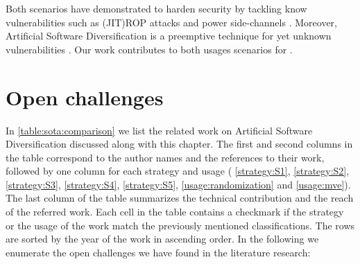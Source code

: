 %

Both scenarios have demonstrated to harden security by tackling know vulnerabilities such as (JIT)ROP attacks \cite{jackson2011compiler} and power side-channels \cite{amarilli2011can}. Moreover, Artificial Software Diversification is a preemptive technique for yet unknown vulnerabilities \cite{jackson}. Our work contributes to both usages scenarios for \wasm.



\section{Open challenges}
\label{sota:openchallenges}

In \autoref{table:sota:comparison} we list the related work on Artificial Software Diversification discussed along with this chapter. The first and second columns in the table correspond to the author names and the references to their work, followed by one column for each strategy and usage ( \autoref{strategy:S1},  \autoref{strategy:S2},  \autoref{strategy:S3},  \autoref{strategy:S4},  \autoref{strategy:S5}, \autoref{usage:randomization} and \autoref{usage:mve}). The last column of the table summarizes the technical contribution and the reach of the referred work. Each cell in the table contains a checkmark if the strategy or the usage of the work match the previously mentioned classifications. The rows are sorted by the year of the work in ascending order. 
In the following we enumerate the open challenges we have found in the literature research:

